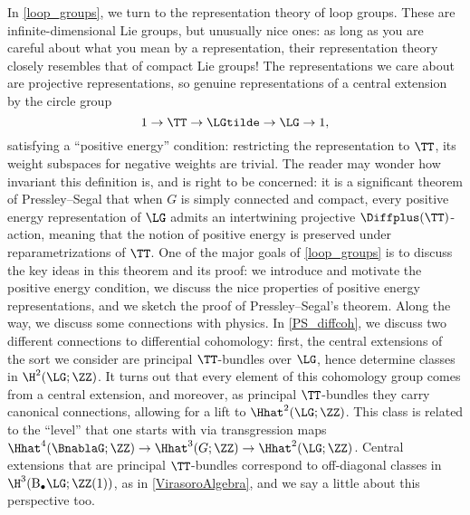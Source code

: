 In \cref{loop_groups}, we turn to the representation theory of loop groups. These are infinite-dimensional Lie
groups, but unusually nice ones: as long as you are careful about what you mean by a representation, their
representation theory closely resembles that of compact Lie groups! The representations we care about are
projective representations, so genuine representations of a central extension by the circle group
\begin{equation}
\label{Tcent_}
	1\to \TT\to \LGtilde\to \LG\to 1,
\end{equation}
satisfying a ``positive energy'' condition: restricting the representation to $\TT$, its weight subspaces for
negative weights are trivial. The reader may wonder how invariant this definition is, and is right to be concerned:
it is a significant theorem of Pressley--Segal \cite[Theorem 13.4.2]{loop} that when $G$ is simply connected and
compact, every positive energy representation of $\LG$ admits an intertwining projective $\Diffplus(\TT)$-action,
meaning that the notion of positive energy is preserved under reparametrizations of $\TT$. One of the major goals
of \cref{loop_groups} is to discuss the key ideas in this theorem and its proof: we introduce and motivate the
positive energy condition, we discuss the nice properties of positive energy representations, and we sketch the
proof of Pressley--Segal's theorem. Along the way, we discuss some connections with physics. In \cref{PS_diffcoh},
we discuss two different connections to differential cohomology: first, the central extensions of the sort we
consider are principal $\TT$-bundles over $\LG$, hence determine classes in $\H^2(\LG;\ZZ)$. It turns out that
every element of this cohomology group comes from a central extension, and moreover, as principal $\TT$-bundles
they carry canonical connections, allowing for a lift to $\Hhat^2(\LG;\ZZ)$. This class is related to the ``level''
that one starts with via transgression maps $\Hhat^4(\BnablaG;\ZZ)\to\Hhat^3(G;\ZZ)\to\Hhat^2(\LG;\ZZ)$. Central
extensions that are principal $\TT$-bundles correspond to off-diagonal classes in $\H^3(\mathrm B_\bullet \LG;
\ZZ(1))$, as in \cref{VirasoroAlgebra}, and we say a little about this perspective too.

